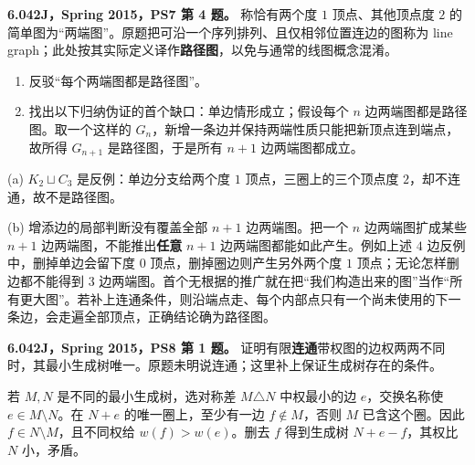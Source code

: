 \begin{exercise}\label{mit:6042-ps7-q4}
\textbf{6.042J，Spring 2015，PS7 第 4 题。}
称恰有两个度 $1$ 顶点、其他顶点度 $2$ 的简单图为“两端图”。原题把可沿一个序列排列、且仅相邻位置连边的图称为 line graph；此处按其实际定义译作\textbf{路径图}，以免与通常的线图概念混淆。
\begin{enumerate}[label=(\alph*)]
\item 反驳“每个两端图都是路径图”。
\item 找出以下归纳伪证的首个缺口：单边情形成立；假设每个 $n$ 边两端图都是路径图。取一个这样的 $G_n$，新增一条边并保持两端性质只能把新顶点连到端点，故所得 $G_{n+1}$ 是路径图，于是所有 $n+1$ 边两端图都成立。
\end{enumerate}
\end{exercise}
\begin{solution}
(a) $K_2\sqcup C_3$ 是反例：单边分支给两个度 $1$ 顶点，三圈上的三个顶点度 $2$，却不连通，故不是路径图。

(b) 增添边的局部判断没有覆盖全部 $n+1$ 边两端图。把一个 $n$ 边两端图扩成某些 $n+1$ 边两端图，不能推出\textbf{任意} $n+1$ 边两端图都能如此产生。例如上述 $4$ 边反例中，删掉单边会留下度 $0$ 顶点，删掉圈边则产生另外两个度 $1$ 顶点；无论怎样删边都不能得到 $3$ 边两端图。首个无根据的推广就在把“我们构造出来的图”当作“所有更大图”。若补上连通条件，则沿端点走、每个内部点只有一个尚未使用的下一条边，会走遍全部顶点，正确结论确为路径图。
\end{solution}

\begin{exercise}\label{mit:6042-ps8-q1}
\textbf{6.042J，Spring 2015，PS8 第 1 题。}
证明有限\textbf{连通}带权图的边权两两不同时，其最小生成树唯一。原题未明说连通；这里补上保证生成树存在的条件。
\end{exercise}
\begin{solution}
若 $M,N$ 是不同的最小生成树，选对称差 $M\triangle N$ 中权最小的边 $e$，交换名称使 $e\in M\setminus N$。在 $N+e$ 的唯一圈上，至少有一边 $f\notin M$，否则 $M$ 已含这个圈。因此 $f\in N\setminus M$，且不同权给 $w(f)>w(e)$。删去 $f$ 得到生成树 $N+e-f$，其权比 $N$ 小，矛盾。
\end{solution}

